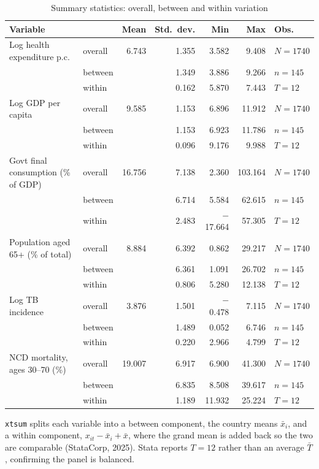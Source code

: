 \documentclass[11pt,a4paper]{article}
\begin{document}
\begin{table}[H]
\centering
\footnotesize
\caption{Summary statistics: overall, between and within variation}
\label{tab:xtsum}
\begin{tabular}{@{}ll rrrr l@{}}
\toprule
Variable & & Mean & Std.\ dev. & Min & Max & Obs. \\
\midrule
Log health expenditure p.c. & overall & 6.743 & 1.355 & 3.582 & 9.408 & $N=1740$ \\
 & between & & 1.349 & 3.886 & 9.266 & $n=145$ \\
 & within  & & 0.162 & 5.870 & 7.443 & $T=12$ \\
\addlinespace
Log GDP per capita & overall & 9.585 & 1.153 & 6.896 & 11.912 & $N=1740$ \\
 & between & & 1.153 & 6.923 & 11.786 & $n=145$ \\
 & within  & & 0.096 & 9.176 & 9.988 & $T=12$ \\
\addlinespace
Govt final consumption (\% of GDP) & overall & 16.756 & 7.138 & 2.360 & 103.164 & $N=1740$ \\
 & between & & 6.714 & 5.584 & 62.615 & $n=145$ \\
 & within  & & 2.483 & $-$17.664 & 57.305 & $T=12$ \\
\addlinespace
Population aged 65+ (\% of total) & overall & 8.884 & 6.392 & 0.862 & 29.217 & $N=1740$ \\
 & between & & 6.361 & 1.091 & 26.702 & $n=145$ \\
 & within  & & 0.806 & 5.280 & 12.138 & $T=12$ \\
\addlinespace
Log TB incidence & overall & 3.876 & 1.501 & $-$0.478 & 7.115 & $N=1740$ \\
 & between & & 1.489 & 0.052 & 6.746 & $n=145$ \\
 & within  & & 0.220 & 2.966 & 4.799 & $T=12$ \\
\addlinespace
NCD mortality, ages 30--70 (\%) & overall & 19.007 & 6.917 & 6.900 & 41.300 & $N=1740$ \\
 & between & & 6.835 & 8.508 & 39.617 & $n=145$ \\
 & within  & & 1.189 & 11.932 & 25.224 & $T=12$ \\
\bottomrule
\end{tabular}
\end{table}

\texttt{xtsum} splits each variable into a between component, the country means
$\bar{x}_i$, and a within component, $x_{it} - \bar{x}_i + \bar{x}$, where the
grand mean is added back so the two are comparable (StataCorp, 2025). Stata
reports $T = 12$ rather than an average $\bar{T}$, confirming the panel is
balanced.
\end{document}
